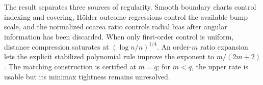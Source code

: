 The result separates three sources of regularity.  Smooth boundary charts control indexing and covering, H\"older outcome regressions control the available bump scale, and the normalized coarea ratio controls radial bias after angular information has been discarded.  When only first-order control is uniform, distance compression saturates at \((\log n/n)^{1/4}\).  An order-\(m\) ratio expansion lets the explicit stabilized polynomial rule improve the exponent to \(m/(2m+2)\).  The matching construction is certified at \(m=q\); for \(m<q\), the upper rate is usable but its minimax tightness remains unresolved.